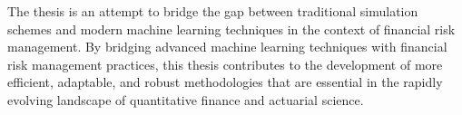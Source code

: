 The thesis is an attempt to bridge the gap between traditional simulation schemes and modern machine learning techniques in the context of financial risk management.
By bridging advanced machine learning techniques with financial risk management practices, this thesis contributes to the development of more efficient, adaptable, and robust methodologies that are essential in the rapidly evolving landscape of quantitative finance and actuarial science.

